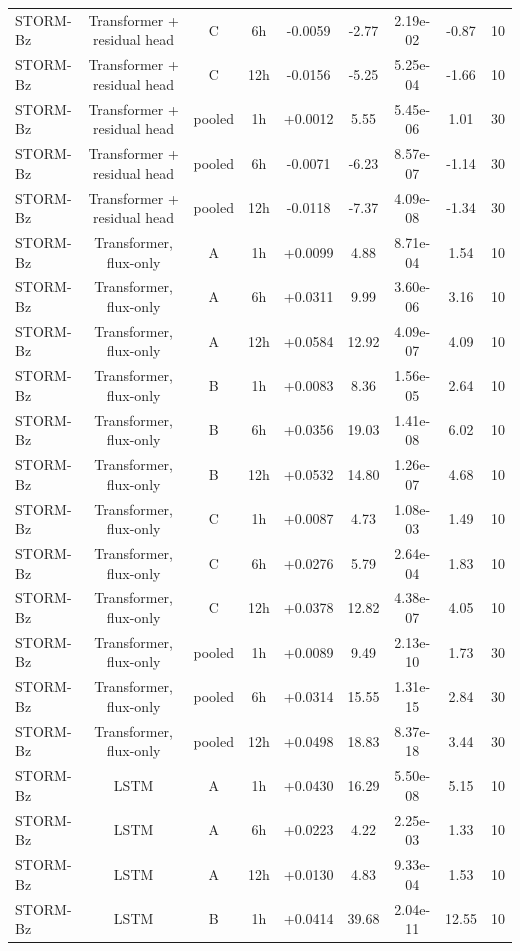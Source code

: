 \begin{tabular}{lcccccccc}
STORM-Bz & Transformer + residual head & C & 6h & -0.0059 & -2.77 & 2.19e-02 & -0.87 & 10 \\
STORM-Bz & Transformer + residual head & C & 12h & -0.0156 & -5.25 & 5.25e-04 & -1.66 & 10 \\
STORM-Bz & Transformer + residual head & pooled & 1h & +0.0012 & 5.55 & 5.45e-06 & 1.01 & 30 \\
STORM-Bz & Transformer + residual head & pooled & 6h & -0.0071 & -6.23 & 8.57e-07 & -1.14 & 30 \\
STORM-Bz & Transformer + residual head & pooled & 12h & -0.0118 & -7.37 & 4.09e-08 & -1.34 & 30 \\
STORM-Bz & Transformer, flux-only & A & 1h & +0.0099 & 4.88 & 8.71e-04 & 1.54 & 10 \\
STORM-Bz & Transformer, flux-only & A & 6h & +0.0311 & 9.99 & 3.60e-06 & 3.16 & 10 \\
STORM-Bz & Transformer, flux-only & A & 12h & +0.0584 & 12.92 & 4.09e-07 & 4.09 & 10 \\
STORM-Bz & Transformer, flux-only & B & 1h & +0.0083 & 8.36 & 1.56e-05 & 2.64 & 10 \\
STORM-Bz & Transformer, flux-only & B & 6h & +0.0356 & 19.03 & 1.41e-08 & 6.02 & 10 \\
STORM-Bz & Transformer, flux-only & B & 12h & +0.0532 & 14.80 & 1.26e-07 & 4.68 & 10 \\
STORM-Bz & Transformer, flux-only & C & 1h & +0.0087 & 4.73 & 1.08e-03 & 1.49 & 10 \\
STORM-Bz & Transformer, flux-only & C & 6h & +0.0276 & 5.79 & 2.64e-04 & 1.83 & 10 \\
STORM-Bz & Transformer, flux-only & C & 12h & +0.0378 & 12.82 & 4.38e-07 & 4.05 & 10 \\
STORM-Bz & Transformer, flux-only & pooled & 1h & +0.0089 & 9.49 & 2.13e-10 & 1.73 & 30 \\
STORM-Bz & Transformer, flux-only & pooled & 6h & +0.0314 & 15.55 & 1.31e-15 & 2.84 & 30 \\
STORM-Bz & Transformer, flux-only & pooled & 12h & +0.0498 & 18.83 & 8.37e-18 & 3.44 & 30 \\
STORM-Bz & LSTM & A & 1h & +0.0430 & 16.29 & 5.50e-08 & 5.15 & 10 \\
STORM-Bz & LSTM & A & 6h & +0.0223 & 4.22 & 2.25e-03 & 1.33 & 10 \\
STORM-Bz & LSTM & A & 12h & +0.0130 & 4.83 & 9.33e-04 & 1.53 & 10 \\
STORM-Bz & LSTM & B & 1h & +0.0414 & 39.68 & 2.04e-11 & 12.55 & 10 \\

\end{tabular}
